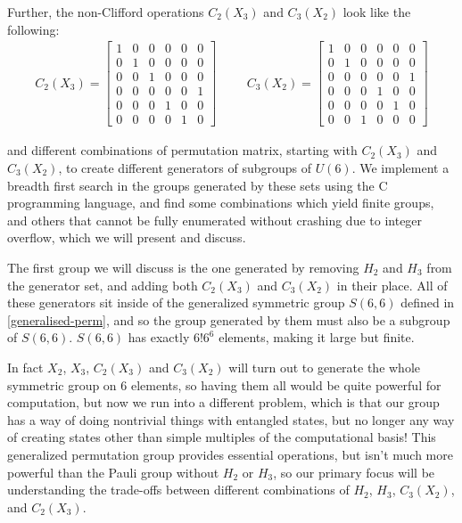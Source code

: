 Further, the non-Clifford operations $C_2(X_3)$ and $C_3(X_2)$ look like the following:
\begin{align*}
C_2(X_3) = \begin{bmatrix}
1 & 0 & 0 & 0 & 0 & 0 \\
0 & 1 & 0 & 0 & 0 & 0 \\
0 & 0 & 1 & 0 & 0 & 0 \\
0 & 0 & 0 & 0 & 0 & 1 \\
0 & 0 & 0 & 1 & 0 & 0 \\
0 & 0 & 0 & 0 & 1 & 0
\end{bmatrix}
&&&
C_3(X_2) = \begin{bmatrix}
1 & 0 & 0 & 0 & 0 & 0 \\
0 & 1 & 0 & 0 & 0 & 0 \\
0 & 0 & 0 & 0 & 0 & 1 \\
0 & 0 & 0 & 1 & 0 & 0 \\
0 & 0 & 0 & 0 & 1 & 0 \\
0 & 0 & 1 & 0 & 0 & 0
\end{bmatrix}
\end{align*}

and different combinations of permutation matrix, starting with $C_2(X_3)$ and $C_3(X_2)$, to create different generators of subgroups of $U(6)$. We implement a breadth first search in the groups generated by these sets using the C programming language, and find some combinations which yield finite groups, and others that cannot be fully enumerated without crashing due to integer overflow, which we will present and discuss.

The first group we will discuss is the one generated by removing $H_2$ and $H_3$ from the generator set, and adding both $C_2(X_3)$ and $C_3(X_2)$ in their place. All of these generators sit inside of the generalized symmetric group $S(6,6)$ defined in \autoref{generalised-perm}, and so the group generated by them must also be a subgroup of $S(6,6)$. $S(6, 6)$ has exactly $6!6^6$ elements, making it large but finite.

In fact $X_2$, $X_3$, $C_2(X_3)$ and $C_3(X_2)$ will turn out to generate the whole symmetric group on 6 elements, so having them all would be quite powerful for computation, but now we run into a different problem, which is that our group has a way of doing nontrivial things with entangled states, but no longer any way of creating states other than simple multiples of the computational basis! This generalized permutation group provides essential operations, but isn't much more powerful than the Pauli group without $H_2$ or $H_3$, so our primary focus will be understanding the trade-offs between different combinations of $H_2$, $H_3$, $C_3(X_2)$, and $C_2(X_3)$.
